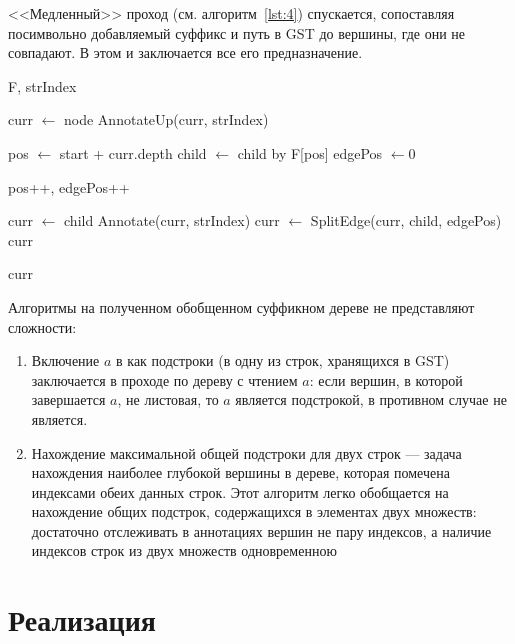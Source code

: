 \documentclass[14pt, russian]{scrartcl}
\begin{document}
<<Медленный>> проход (см. алгоритм~\ref{lst:4}) спускается, сопоставляя посимвольно добавляемый суффикс и путь в GST до вершины, где они не совпадают. В этом и заключается все его предназначение.

\begin{algorithm}[H]
\caption{SlowScan(node, start)}
\label{lst:4}
\scriptsize
\begin{algorithmic}[1]

\Global F,  strIndex

\State curr $\gets$ node
\State AnnotateUp(curr, strIndex)

\State pos $\gets$ start + curr.depth
    \State child $\gets$ child by F[pos]
    \State edgePos $\gets 0$

     
        \State pos++, edgePos++
    \EndWhile

      
        \State curr $\gets$ child
        \State Annotate(curr, strIndex)
    \Else
        \State curr $\gets$ SplitEdge(curr, child, edgePos)
        \State \Return curr
    \EndIf
\EndWhile

\State \Return curr
\end{algorithmic}
\end{algorithm}


Алгоритмы на полученном обобщенном суффикном дереве не представляют сложности:

\begin{enumerate}
\item Включение $a$ в как подстроки (в одну из строк, хранящихся в GST) заключается в проходе по дереву с чтением $a$: если вершин, в которой завершается $a$, не листовая, то $a$ является подстрокой, в противном случае не является.

\item Нахождение максимальной общей подстроки для двух строк --- задача нахождения наиболее глубокой вершины в дереве, которая помечена индексами обеих данных строк. Этот алгоритм легко обобщается на нахождение общих подстрок, содержащихся в элементах двух множеств: достаточно отслеживать в аннотациях вершин не пару индексов, а наличие индексов строк из двух множеств одновременною
 \end{enumerate}


\newpage
\section{Реализация}
\end{document}
